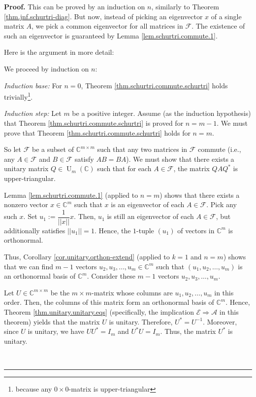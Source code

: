 \documentclass[numbers=enddot,12pt,final,onecolumn,notitlepage]{scrartcl}%
\numberwithin{exer}{subsection}
\theoremstyle{definition}
\newenvironment{proof}[1][Proof]{\noindent\textbf{#1.} }{\ \rule{0.5em}{0.5em}}
\begin{document}
\begin{proof}
This can be proved by an induction on $n$, similarly to Theorem
\ref{thm.jnf.schurtri-diag}. But now, instead of picking an eigenvector $x$ of
a single matrix $A$, we pick a common eigenvector for all matrices in
$\mathcal{F}$. The existence of such an eigenvector is guaranteed by Lemma
\ref{lem.schurtri.commute.1}.

Here is the argument in more detail:

We proceed by induction on $n$:

\textit{Induction base:} For $n=0$, Theorem
\ref{thm.schurtri.commute.schurtri} holds trivially\footnote{because any
$0\times0$-matrix is upper-triangular}.

\textit{Induction step:} Let $m$ be a positive integer. Assume (as the
induction hypothesis) that Theorem \ref{thm.schurtri.commute.schurtri} is
proved for $n=m-1$. We must prove that Theorem
\ref{thm.schurtri.commute.schurtri} holds for $n=m$.

So let $\mathcal{F}$ be a subset of $\mathbb{C}^{m\times m}$ such that any two
matrices in $\mathcal{F}$ commute (i.e., any $A\in\mathcal{F}$ and
$B\in\mathcal{F}$ satisfy $AB=BA$). We must show that there exists a unitary
matrix $Q\in\operatorname*{U}\nolimits_{m}\left(  \mathbb{C}\right)  $ such
that for each $A\in\mathcal{F}$, the matrix $QAQ^{\ast}$ is upper-triangular.

Lemma \ref{lem.schurtri.commute.1} (applied to $n=m$) shows that there exists
a nonzero vector $x\in\mathbb{C}^{m}$ such that $x$ is an eigenvector of each
$A\in\mathcal{F}$. Pick any such $x$. Set $u_{1}:=\dfrac{1}{\left\vert
\left\vert x\right\vert \right\vert }x$. Then, $u_{1}$ is still an eigenvector
of each $A\in\mathcal{F}$, but additionally satisfies $\left\vert \left\vert
u_{1}\right\vert \right\vert =1$. Hence, the $1$-tuple $\left(  u_{1}\right)
$ of vectors in $\mathbb{C}^{m}$ is orthonormal.

Thus, Corollary \ref{cor.unitary.orthon-extend} (applied to $k=1$ and $n=m$)
shows that we can find $m-1$ vectors $u_{2},u_{3},\ldots,u_{m}\in
\mathbb{C}^{m}$ such that $\left(  u_{1},u_{2},\ldots,u_{m}\right)  $ is an
orthonormal basis of $\mathbb{C}^{m}$. Consider these $m-1$ vectors
$u_{2},u_{3},\ldots,u_{m}$.

Let $U\in\mathbb{C}^{m\times m}$ be the $m\times m$-matrix whose columns are
$u_{1},u_{2},\ldots,u_{m}$ in this order. Then, the columns of this matrix
form an orthonormal basis of $\mathbb{C}^{m}$. Hence, Theorem
\ref{thm.unitary.unitary.eqs} (specifically, the implication $\mathcal{E}%
\Longrightarrow\mathcal{A}$ in this theorem) yields that the matrix $U$ is
unitary. Therefore, $U^{\ast}=U^{-1}$. Moreover, since $U$ is unitary, we have
$UU^{\ast}=I_{m}$ and $U^{\ast}U=I_{m}$. Thus, the matrix $U^{\ast}$ is unitary.


\end{proof}
\end{document}
